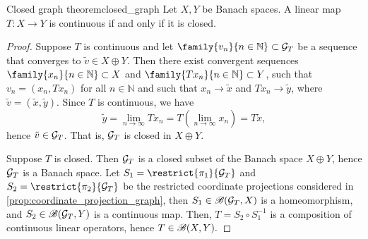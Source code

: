 \begin{theorem}{Closed graph theorem}{closed_graph}
    Let \(X, Y\) be Banach spaces. A linear map \(T : X \to Y\) is continuous if and only if it is closed.
\end{theorem}
\begin{proof}
    Suppose \(T\) is continuous and let \(\family{v_n}{n \in \mathbb{N}}\subset \graph{T}\) be a sequence that converges to \(\tilde{v} \in X \oplus Y\). Then there exist convergent sequences \(\family{x_n}{n \in \mathbb{N}} \subset X\) and \(\family{Tx_n}{n \in \mathbb{N}} \subset Y\), such that \(v_n = (x_n, Tx_n)\) for all \(n \in \mathbb{N}\) and such that \(x_n \to \tilde{x}\) and \(Tx_n \to \tilde{y}\), where \(\tilde{v} = (\tilde{x}, \tilde{y})\). Since \(T\) is continuous, we have
    \begin{equation*}
        \tilde{y} = \lim_{n\to\infty} Tx_n = T\left(\lim_{n\to\infty} x_n\right)= T\tilde{x},
    \end{equation*}
    hence \(\tilde{v} \in \mathcal{G}_{T}\). That is, \(\mathcal{G}_{T}\) is closed in \(X \oplus Y\).

    Suppose \(T\) is closed. Then \(\mathcal{G}_{T}\) is a closed subset of the Banach space \(X \oplus Y\), hence \(\mathcal{G}_{T}\) is a Banach space. Let \(S_1 = \restrict{\pi_1}{\graph{T}}\) and \(S_2 = \restrict{\pi_2}{\graph{T}}\) be the restricted coordinate projections considered in \cref{prop:coordinate_projection_graph}, then \(S_1 \in \mathscr{B}(\mathcal{G}_{T}, X)\) is a homeomorphism, and \(S_2 \in \mathscr{B}(\mathcal{G}_{T}, Y)\) is a continuous map. Then, \(T = S_2 \circ S_1^{-1}\) is a composition of continuous linear operators, hence \(T \in \mathscr{B}(X, Y).\)
\end{proof}
